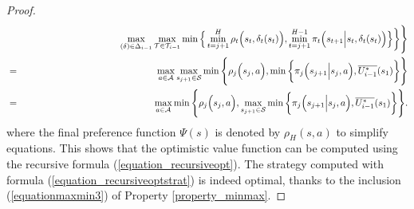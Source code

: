 \begin{proof}
\begin{eqnarray}
\nonumber & & \hspace{3.5cm} \max_{(\delta) \in \Delta_{i-1}} \max_{\mathcal{T} \in \mathcal{T}_{i-1}} \min \Big\{  \min_{t=j+1}^{H} \rho_t \Big( s_t,\delta_t(s_t) \Big), \min_{t=j+1}^{H-1} \pi_t \Big( s_{t+1} \Big\vert s_t , \delta_t(s_t) \Big) \Big\} \bigg\} \Bigg\} \\
\nonumber & = &  \displaystyle \max_{a \in \mathcal{A}} \max_{s_{j+1} \in \mathcal{S}} \min \Bigg\{ \rho_j \Big( s_j,a \Big), \min \bigg\{ \pi_j \Big( s_{j+1} \Big\vert s_j, a \Big),\overline{U^*_{i-1}}(s_1) \bigg\} \Bigg\} \\
\nonumber & = &  \displaystyle \max_{a \in \mathcal{A}}  \min \Bigg\{ \rho_j \Big( s_j,a \Big), \max_{s_{j+1} \in \mathcal{S}} \min \bigg\{ \pi_j \Big( s_{j+1} \Big\vert s_j, a \Big),\overline{U^*_{i-1}}(s_1) \bigg\} \Bigg\} .
\end{eqnarray}
where the final preference function $\Psi(s)$ is denoted by $\rho_H(s,a)$ to simplify equations.
This shows that the optimistic value function can be computed using the recursive formula (\ref{equation_recursiveopt}).
The strategy computed with formula (\ref{equation_recursiveoptstrat}) 
is indeed optimal, thanks to the inclusion (\ref{equationmaxmin3}) of Property \ref{property_minmax}.


\end{proof}
